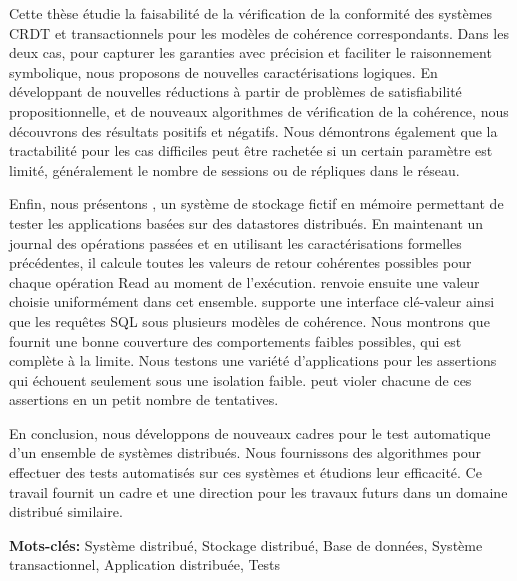 Cette thèse étudie la faisabilité de la vérification de la conformité des systèmes CRDT et transactionnels pour les modèles de cohérence correspondants. Dans les deux cas, pour capturer les garanties avec précision et faciliter le raisonnement symbolique, nous proposons de nouvelles caractérisations logiques. En développant de nouvelles réductions à partir de problèmes de satisfiabilité propositionnelle, et de nouveaux algorithmes de vérification de la cohérence, nous découvrons des résultats positifs et négatifs. Nous démontrons également que la tractabilité pour les cas difficiles peut être rachetée si un certain paramètre est limité, généralement le nombre de sessions ou de répliques dans le réseau.

Enfin, nous présentons \tool{}, un système de stockage fictif en mémoire permettant de tester les applications basées sur des datastores distribués. En maintenant un journal des opérations passées et en utilisant les caractérisations formelles précédentes, il calcule toutes les valeurs de retour cohérentes possibles pour chaque opération \textrm{Read} au moment de l'exécution. \tool{} renvoie ensuite une valeur choisie uniformément dans cet ensemble. \tool{} supporte une interface clé-valeur ainsi que les requêtes SQL sous plusieurs modèles de cohérence. Nous montrons que \tool{} fournit une bonne couverture des comportements faibles possibles, qui est complète à la limite. Nous testons une variété d'applications pour les assertions qui échouent seulement sous une isolation faible. \tool{} peut violer chacune de ces assertions en un petit nombre de tentatives.

En conclusion, nous développons de nouveaux cadres pour le test automatique d'un ensemble de systèmes distribués. Nous fournissons des algorithmes pour effectuer des tests automatisés sur ces systèmes et étudions leur efficacité. Ce travail fournit un cadre et une direction pour les travaux futurs dans un domaine distribué similaire. 

\textbf{Mots-clés:} Système distribué, Stockage distribué, Base de données, Système transactionnel, Application distribuée, Tests